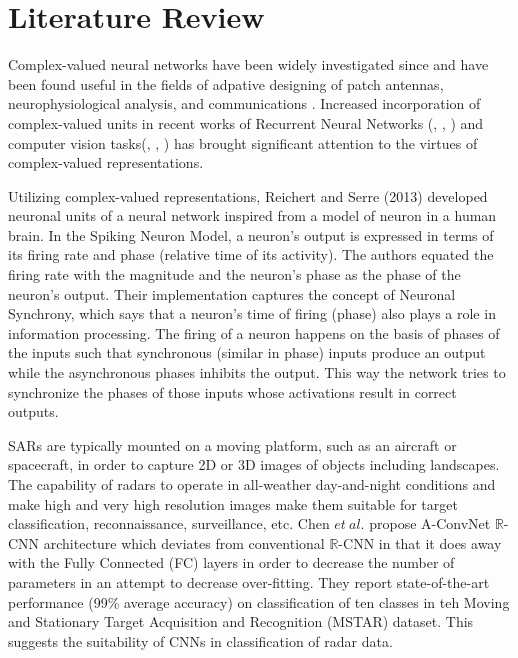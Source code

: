 \chapter{Literature Review}\label{chap:comp}

Complex-valued neural networks have been widely investigated since and have been found useful in the fields of adpative designing of patch antennas, neurophysiological analysis, and communications \cite{hirose2012complex}. Increased incorporation of complex-valued units in recent works of Recurrent Neural Networks (\cite{ArjovskySB15}, \cite{wisdom2016full}, \cite{danihelka2016associative}) and computer vision tasks(\cite{oyallon2015deep}, \cite{bruna2015theoretical}, \cite{worrall2017harmonic}) has brought significant attention to the virtues of complex-valued representations. 

Utilizing complex-valued representations, Reichert and Serre (2013) \cite{reichert2013neuronal} developed neuronal units of a neural network inspired from a model of neuron in a human brain. In the Spiking Neuron Model, a neuron's output is expressed in terms of its firing rate and phase (relative time of its activity). The authors equated the firing rate with the magnitude and the neuron's phase as the phase of the neuron's output. Their implementation captures the concept of Neuronal Synchrony, which says that a neuron's time of firing (phase) also plays a role in information processing. The firing of a neuron happens on the basis of phases of the inputs such that synchronous (similar in phase) inputs produce an output while the asynchronous phases inhibits the output. This way the network tries to synchronize the phases of those inputs whose activations result in correct outputs.
 
SARs are typically mounted on a moving platform, such as an aircraft or spacecraft, in order to capture 2D or 3D images of objects including landscapes. The capability of radars to operate in all-weather day-and-night conditions and make high and very high resolution images make them suitable for target classification, reconnaissance,
surveillance, etc. 
Chen $et \ al.$ propose A-ConvNet $\mathbb{R}$-CNN architecture which deviates from conventional $\mathbb{R}$-CNN in that it does away with the Fully Connected (FC) layers in order to decrease the number of parameters in an attempt to decrease over-fitting. They report state-of-the-art performance (99\% average accuracy) on classification of ten classes in teh Moving and Stationary Target Acquisition and Recognition (MSTAR) dataset. This suggests the suitability of CNNs in classification of radar data. 

